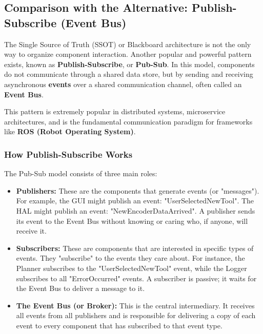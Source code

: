 
\subsection{Comparison with the Alternative: Publish-Subscribe (Event Bus)}
\label{subsec:pub_sub_comparison}

The Single Source of Truth (SSOT) or Blackboard architecture is not the only way to organize component interaction. Another popular and powerful pattern exists, known as \textbf{Publish-Subscribe}, or \textbf{Pub-Sub}. In this model, components do not communicate through a shared data store, but by sending and receiving asynchronous \textbf{events} over a shared communication channel, often called an \textbf{Event Bus}.

This pattern is extremely popular in distributed systems, microservice architectures, and is the fundamental communication paradigm for frameworks like \textbf{ROS (Robot Operating System)}.

\subsubsection{How Publish-Subscribe Works}
\label{subsubsec:how_pub_sub_works}

The Pub-Sub model consists of three main roles:
\begin{itemize}
    \item \textbf{Publishers:} These are the components that generate events (or "messages"). For example, the GUI might publish an event: "UserSelectedNewTool". The HAL might publish an event: "NewEncoderDataArrived". A publisher sends its event to the Event Bus without knowing or caring who, if anyone, will receive it.
    
    \item \textbf{Subscribers:} These are components that are interested in specific types of events. They "subscribe" to the events they care about. For instance, the Planner subscribes to the "UserSelectedNewTool" event, while the Logger subscribes to all "ErrorOccurred" events. A subscriber is passive; it waits for the Event Bus to deliver a message to it.
    
    \item \textbf{The Event Bus (or Broker):} This is the central intermediary. It receives all events from all publishers and is responsible for delivering a copy of each event to every component that has subscribed to that event type.
\end{itemize}

